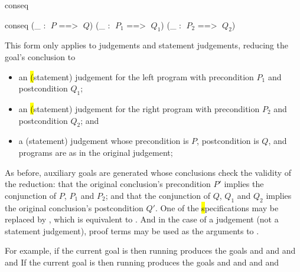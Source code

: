 \begin{tactic}{conseq}
  \begin{tsyntax}{conseq (_ : $\;P$ ==> $\;Q$) (_ : $\;P_1$ ==>
      $\;Q_1$) (_ : $\;P_2$ ==> $\;Q_2$)}

    This form only applies to \prhl judgements and statement
    judgements, reducing the goal's conclusion to
    \begin{itemize}
    \item an \hl (statement) judgement for the left program with
      precondition $P_1$ and postcondition $Q_1$;

    \item an \hl (statement) judgement for the right program with
      precondition $P_2$ and postcondition $Q_2$; and

    \item a \prhl (statement) judgement whose precondition is $P$,
      postcondition is $Q$, and programs are as in the original
      judgement;

    \end{itemize}
    As before, auxiliary goals are generated whose conclusions
    check the validity of the reduction: that the original
    conclusion's precondition $P'$ implies the conjunction of
    $P$, $P_1$ and $P_2$; and that the conjunction of
    $Q$, $Q_1$ and $Q_2$ implies the original conclusion's
    postcondition $Q'$. One of the \hl specifications may be
    replaced by \ec{_}, which is equivalent to
    . And in the case of
    a \prhl judgement (not a statement judgement), proof
    terms may be used as the arguments to .

    \medskip For example, if the current goal is
     then
    running 
    produces the goals
    and
    and
    and
    and
    If the current goal is
     then
    running 
    produces the goals
    and
    and
    and
    and


\end{tsyntax}
\end{tactic}
